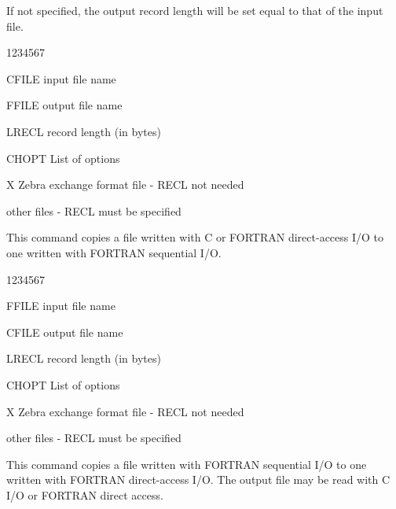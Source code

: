If not specified, the output record length will be set equal
to that of the input file.

\begin{DLtt}{1234567}
\item[CFILE]input  file name
\item[FFILE]output file name
\item[LRECL]record length (in bytes)
\item[CHOPT]List of options
\begin{DLtt}{12}
\item[X]Zebra exchange format file - RECL not needed
\item[ ]other files - RECL must be specified
\end{DLtt}
\end{DLtt}
This command copies a file written with C or FORTRAN
direct-access I/O to one written with FORTRAN sequential I/O.
\begin{DLtt}{1234567}
\item[FFILE]input  file name
\item[CFILE]output file name
\item[LRECL]record length (in bytes)
\item[CHOPT]List of options
\begin{DLtt}{12}
\item[X]Zebra exchange format file - RECL not needed
\item[ ]other files - RECL must be specified
\end{DLtt}
\end{DLtt}
This command copies a file written with FORTRAN sequential
I/O to one written with FORTRAN direct-access I/O. The
output file may be read with C I/O or FORTRAN direct access.
